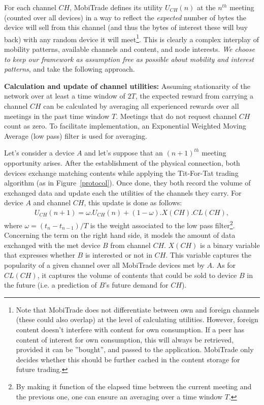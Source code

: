 For each channel $CH$, MobiTrade defines its utility $U_{CH}(n)$ at the $n^{th}$ meeting (counted over all devices) in a way to reflect the \emph{expected} number of bytes the device will sell from this channel (and thus the bytes of interest these will buy back) with any random device it will meet\footnote{Note that MobiTrade does not differentiate between own and foreign channels (these could also overlap) at the level of calculating utilities. However, foreign content doesn't interfere with content for own consumption. If a peer has content of interest for own consumption, this will always be retrieved, provided it can be ''bought'', and passed to the application. MobiTrade only decides whether this should be further cached in the content storage for future trading.}. This is clearly a complex interplay of mobility patterns, available channels and content, and node interests. \emph{We choose to keep our framework as assumption free as possible about mobility and interest patterns}, and take the following approach.

\noindent \textbf{Calculation and update of channel utilities:}
Assuming stationarity of the network over at least a time window of $2T$, the expected reward from carrying a channel $CH$ can be calculated by averaging all experienced rewards over all meetings in the past time window $T$. Meetings that do not request channel $CH$ count as zero. To facilitate implementation, an Exponential Weighted Moving Average (low pass) filter is used for averaging.

Let's consider a device $A$ and let's suppose that an $(n+1)^{th}$ meeting opportunity arises. After the establishment of the physical connection, both devices exchange matching contents while applying the Tit-For-Tat trading algorithm (as in Figure~\ref{protocol}). Once done, they both record the volume of exchanged data and update each the utilities of the channels they carry. For device $A$ and channel $CH$, this update is done as follows:
\begin{eqnarray*}
U_{CH}(n+1) = \omega . U_{CH}(n) + (1 - \omega) . X(CH) . CL(CH),
\label{eq:utility-updating}
\end{eqnarray*}
where $\omega = (t_{n}-t_{n-1})/T$ is the weight associated to the low pass filter\footnote{By making it function of the elapsed time between the current meeting and the previous one, one can ensure an averaging over a time window $T$.}. Concerning the term on the right hand side, it models the amount of data exchanged with the met device $B$ from channel $CH$. $X(CH)$ is a binary variable that expresses whether $B$ is interested or not in $CH$. This variable captures the popularity of a given channel over all MobiTrade devices met by $A$. As for $CL(CH)$, it captures the volume of contents that could be sold to device $B$ in the future (i.e. a prediction of $B$'s future demand for $CH$).

